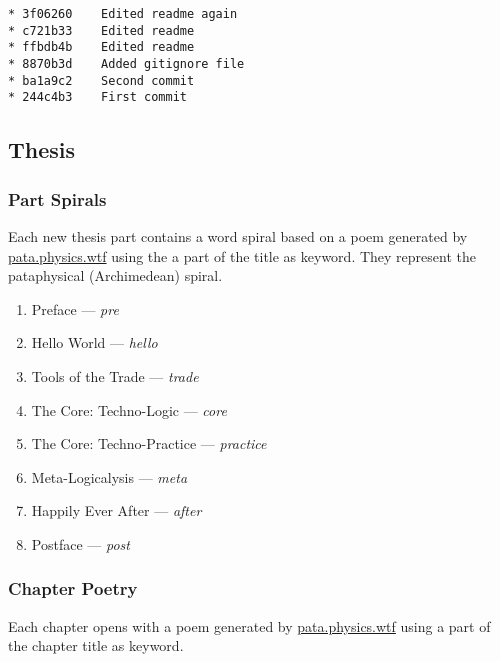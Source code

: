 \begin{verbatim}
* 3f06260	 Edited readme again
* c721b33	 Edited readme
* ffbdb4b	 Edited readme
* 8870b3d	 Added gitignore file
* ba1a9c2	 Second commit
* 244c4b3	 First commit
\end{verbatim}


\subsection{Thesis}

\subsubsection{Part Spirals}

Each new thesis part contains a word spiral based on a poem generated by \url{pata.physics.wtf} using the a part of the title as keyword. They represent the pataphysical (Archimedean) spiral.

\begin{enumerate}
  \item Preface --- \emph{pre}
  \item Hello World --- \emph{hello}
  \item Tools of the Trade --- \emph{trade}
  \item The Core: Techno-Logic --- \emph{core}
  \item The Core: Techno-Practice --- \emph{practice}
  \item Meta-Logicalysis --- \emph{meta}
  \item Happily Ever After --- \emph{after}
  \item Postface --- \emph{post}
\end{enumerate}

\subsubsection{Chapter Poetry}

Each chapter opens with a poem generated by \url{pata.physics.wtf} using a part of the chapter title as keyword.

